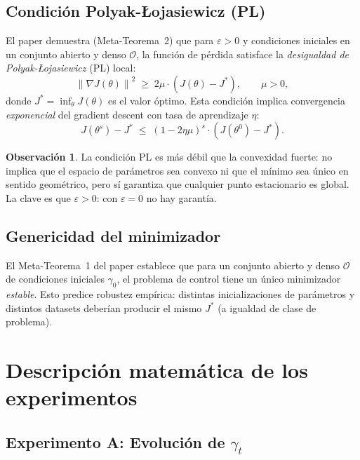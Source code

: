 \documentclass[11pt, a4paper]{article}
\theoremstyle{definition}
\newtheorem{remark}{Observación}[section]
\newcommand{\norm}[1]{\left\|#1\right\|}
\begin{document}
\subsection{Condición Polyak-Łojasiewicz (PL)}
\label{sec:pl}

El paper \cite{daudin2025} demuestra (Meta-Teorema~2) que para $\varepsilon > 0$
y condiciones iniciales en un conjunto abierto y denso $\mathcal{O}$, la
función de pérdida satisface la \emph{desigualdad de Polyak-Łojasiewicz}
(PL) local:
\begin{equation}
  \label{eq:pl}
  \norm{\nabla J(\theta)}^2 \;\geq\; 2\mu \cdot (J(\theta) - J^*),
  \qquad \mu > 0,
\end{equation}
donde $J^* = \inf_\theta J(\theta)$ es el valor óptimo. Esta condición
implica convergencia \emph{exponencial} del gradient descent con tasa
de aprendizaje $\eta$:
\begin{equation}
  J(\theta^s) - J^* \;\leq\; (1 - 2\eta\mu)^s \cdot (J(\theta^0) - J^*).
\end{equation}

\begin{remark}
  La condición PL es más débil que la convexidad fuerte: no implica que el
  espacio de parámetros sea convexo ni que el mínimo sea único en sentido
  geométrico, pero sí garantiza que cualquier punto estacionario es global.
  La clave es que $\varepsilon > 0$: con $\varepsilon = 0$ no hay garantía.
\end{remark}

\subsection{Genericidad del minimizador}
\label{sec:genericidad}

El Meta-Teorema~1 del paper establece que para un conjunto abierto y denso
$\mathcal{O}$ de condiciones iniciales $\gamma_0$, el problema de control
tiene un único minimizador \emph{estable}. Esto predice robustez empírica:
distintas inicializaciones de parámetros y distintos datasets deberían
producir el mismo $J^*$ (a igualdad de clase de problema).

\section{Descripción matemática de los experimentos}
\label{sec:experimentos}

\subsection{Experimento A: Evolución de $\gamma_t$}
\end{document}
